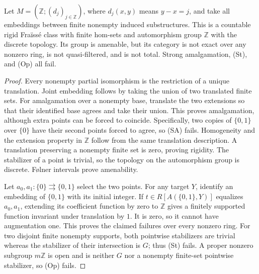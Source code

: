 \begin{example}\label{A:translation}
Let $M=(\mathbb Z;(d_j)_{j\in\mathbb Z})$, where
$d_j(x,y)$ means $y-x=j$, and take all embeddings between finite
nonempty induced substructures. This is a countable rigid Fra\"iss\'e
class with finite hom-sets and automorphism group $\mathbb Z$ with the
discrete topology. Its group is amenable, but its category is not
exact over any nonzero ring, is not quasi-filtered, and is not total.
Strong amalgamation, (St), and (Op) all fail.
\end{example}
\begin{proof}
Every nonempty partial isomorphism is the restriction of a unique
translation. Joint embedding follows by taking the union of two
translated finite sets. For amalgamation over a nonempty base,
translate the two extensions so that their identified base agrees and
take their union. This proves amalgamation, although extra points can
be forced to coincide. Specifically, two copies of $\{0,1\}$ over
$\{0\}$ have their second points forced to agree, so (SA) fails.
Homogeneity and the extension property in $\mathbb Z$ follow from the
same translation description. A translation preserving a nonempty
finite set is zero, proving rigidity. The stabilizer of a point is
trivial, so the topology on the automorphism group is discrete.
F\o lner intervals prove amenability.

Let $a_0,a_1:\{0\}\rightrightarrows\{0,1\}$ select the two points.
For any target $Y$, identify an embedding of $\{0,1\}$ with its initial
integer. If $t\in R[A(\{0,1\},Y)]$ equalizes $a_0,a_1$, extending its
coefficient function by zero to $\mathbb Z$ gives a finitely supported
function invariant under translation by $1$. It is zero, so it cannot
have augmentation one. This proves the claimed failures over every
nonzero ring. For two disjoint finite nonempty supports, both pointwise
stabilizers are trivial whereas the stabilizer of their intersection
is $G$; thus (St) fails. A proper nonzero subgroup $m\mathbb Z$ is open
and is neither $G$ nor a nonempty finite-set pointwise stabilizer, so
(Op) fails.
\end{proof}

